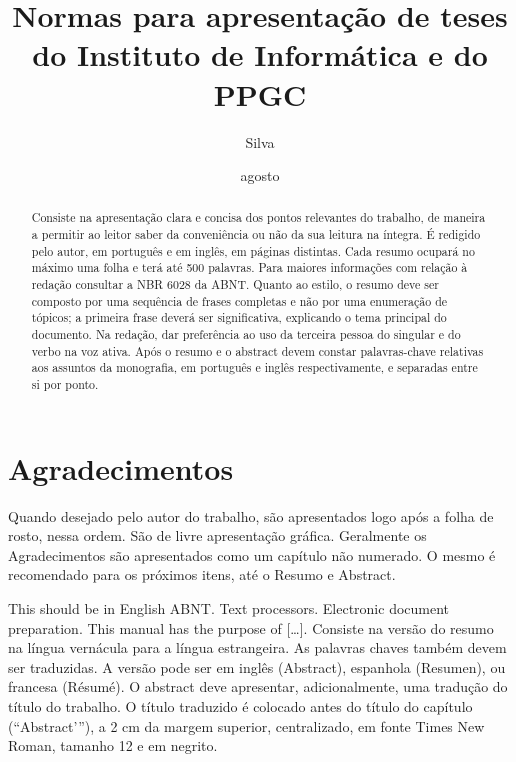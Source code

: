 \documentclass[ppgc,diss]{iiufrgs}
\title{
    Normas para apresentação de teses do Instituto de Informática e do PPGC
}
\author{Silva}{João da}
\date{agosto}{2014}
\begin{document}
\maketitle


\chapter*{Agradecimentos}
Quando desejado pelo autor do trabalho, são apresentados logo após a folha de
rosto, nessa ordem.
São de livre apresentação gráfica.
Geralmente os Agradecimentos são apresentados como um capítulo não numerado.
O mesmo é recomendado para os próximos itens, até o Resumo e Abstract.


\begin{abstract}
    Consiste na apresentação clara e concisa dos pontos relevantes do trabalho,
    de maneira a permitir ao leitor saber da conveniência ou não da sua leitura na íntegra.
    É redigido pelo autor, em português e em inglês, em páginas distintas.
    Cada resumo ocupará no máximo uma folha e terá até 500 palavras.
    Para maiores informações com relação à redação consultar a NBR 6028 da ABNT.
    Quanto ao estilo, o resumo deve ser composto por uma sequência de frases
    completas e não por uma enumeração de tópicos; a primeira frase deverá ser
    significativa, explicando o tema principal do documento.
    Na redação, dar preferência ao uso da terceira pessoa do singular e do verbo na voz ativa.
    Após o resumo e o abstract devem constar palavras-chave relativas aos assuntos
    da monografia, em português e inglês respectivamente, e separadas entre si por ponto.
\end{abstract}

\begin{englishabstract}
    {This should be in English}
    {ABNT. Text processors. Electronic document preparation.}
    This manual has the purpose of [\ldots].
    Consiste na versão do resumo na língua vernácula para a língua estrangeira.
    As palavras chaves também devem ser traduzidas.
    A versão pode ser em inglês (Abstract), espanhola (Resumen), ou francesa (Résumé).
    O abstract deve apresentar, adicionalmente, uma tradução do título do trabalho.
    O título traduzido é colocado antes do título do capítulo (“Abstract’”), a
    2 cm da margem superior, centralizado, em fonte Times New Roman, tamanho 12 e em negrito.
\end{englishabstract}
\end{document}
